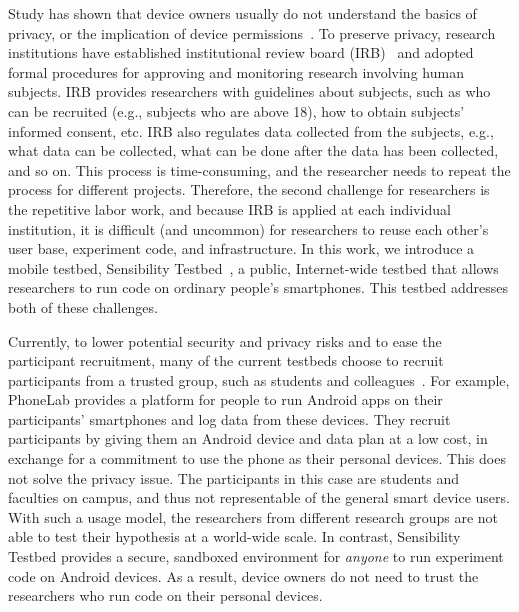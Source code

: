 Study has shown that device owners usually do not understand the 
basics of privacy, or the implication of device 
permissions~\cite{camp2015respecting}. 
To preserve privacy, research institutions have established 
institutional review board (IRB)~\cite{irb} and adopted formal 
procedures for approving and monitoring research involving 
human subjects. IRB provides researchers with guidelines about 
subjects, such as who can be recruited (e.g., subjects
who are above 18), 
how to obtain subjects' informed consent, etc. IRB also 
regulates data collected from the subjects, e.g., what data can be collected, what can 
be done after the data has been collected, and so on. This
process is time-consuming, and the researcher needs to repeat
the process for different projects. Therefore, the second challenge
for researchers is the repetitive labor work, and because IRB is
applied at each individual institution, it is difficult (and uncommon) 
for researchers to reuse each other's user base, experiment code, 
and infrastructure. In this work, we introduce a mobile testbed, 
Sensibility Testbed~\cite{sensibility, zhuang2015privacy}, a public, 
Internet-wide testbed that allows researchers to run code on ordinary
people's smartphones. This testbed addresses both of these challenges.

Currently, to lower potential security and privacy risks and to ease the 
participant recruitment, many of the current testbeds choose to 
recruit participants from a trusted group, such as students and 
colleagues~\cite{hao2013isleep, wang2012no, 
wang2013sensing}. For example, PhoneLab provides a platform for 
people to run Android apps on their participants' smartphones 
and log data from these devices. They recruit participants by 
giving them an Android device and data plan at a low cost, in 
exchange for a commitment to use the phone as their personal 
devices. This does not solve the privacy issue. 
The participants in this case are students and faculties on campus, 
and thus not representable of the general smart device users. 
With such a usage model, the researchers from different research 
groups are not able to test their hypothesis at a world-wide scale.
In contrast, Sensibility Testbed provides a secure, sandboxed 
environment for \textit{anyone} to run experiment code on Android devices. 
As a result, device owners do not need to trust the researchers 
who run code on their personal devices.
   
